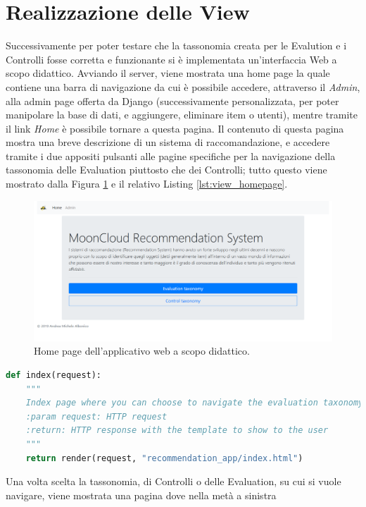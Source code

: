 \section*{Realizzazione delle View}
Successivamente per poter testare che la tassonomia creata per le Evalution e i Controlli fosse corretta e funzionante si è 
implementata un'interfaccia Web a scopo didattico.
Avviando il server, viene mostrata una home page la quale contiene una barra di navigazione da cui è possibile accedere,
attraverso il \textit{Admin}, alla admin page offerta da Django (successivamente personalizzata, per poter manipolare la base di dati, 
e aggiungere, eliminare item o utenti), mentre tramite il link \textit{Home} è possibile tornare a 
questa pagina. Il contenuto di questa pagina mostra una breve descrizione di un sistema di raccomandazione, e accedere tramite i due 
appositi pulsanti alle pagine specifiche per la navigazione della tassonomia delle Evaluation piuttosto che dei Controlli; tutto questo 
viene mostrato dalla Figura \ref{fig:MCRS_homepage} e il relativo Listing \ref{lst:view_homepage}.
%
\begin{figure}[ht!]
    \includegraphics[scale=0.3]{images/MCRS_homepage.png}
    \caption{Home page dell'applicativo web a scopo didattico.}
    \label{fig:MCRS_homepage}
\end{figure}
\lstset{style=python_code_style}
\begin{lstlisting}[language=Python, label=lst:view_homepage, caption={Parte principale del codice delle View della soluzione per gestire l'accesso 
    alla home page.}]
def index(request):
    """
    Index page where you can choose to navigate the evaluation taxonomy or the control taxonomy.
    :param request: HTTP request
    :return: HTTP response with the template to show to the user
    """
    return render(request, "recommendation_app/index.html")
\end{lstlisting}
%
Una volta scelta la tassonomia, di Controlli o delle Evaluation, su cui si vuole navigare, viene mostrata una pagina dove nella metà a sinistra 
